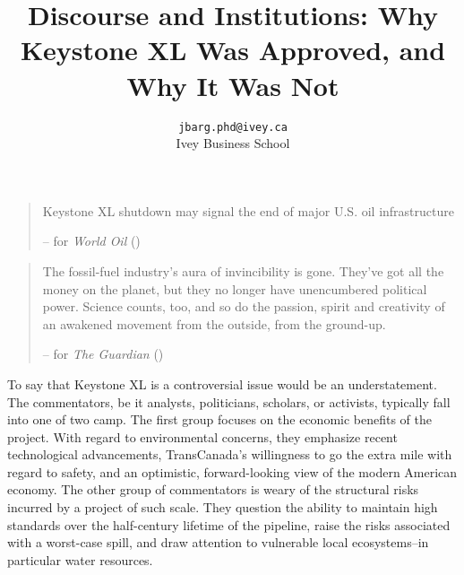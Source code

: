 \documentclass{article}
\title{Discourse and Institutions: Why Keystone XL Was Approved, and Why It Was Not}
\author{
	\texttt{jbarg.phd@ivey.ca}\\
	Ivey Business School
}
\begin{document}
	\maketitle
	\clearpage



	\begin{quote}
		Keystone XL shutdown may signal the end of major U.S. oil infrastructure

		-- \citeauthor{Freitas2021} for \textit{World Oil} (\citeyear{Freitas2021})
	\end{quote}

	\begin{quote}
		The fossil-fuel industry’s aura of invincibility is gone. They’ve got all the money on the planet, but they no longer have unencumbered political power. Science counts, too, and so do the passion, spirit and creativity of an awakened movement from the outside, from the ground-up.

		-- \citeauthor{McKibben2015} for \textit{The Guardian} (\citeyear{McKibben2015})
	\end{quote}

	To say that Keystone XL is a controversial issue would be an understatement. The commentators, be it analysts, politicians, scholars, or activists, typically fall into one of two camp. The first group focuses on the economic benefits of the project. With regard to environmental concerns, they emphasize recent technological advancements, TransCanada's willingness to go the extra mile with regard to safety, and an optimistic, forward-looking view of the modern American economy. The other group of commentators is weary of the structural risks incurred by a project of such scale. They question the ability to maintain high standards over the half-century lifetime of the pipeline, raise the risks associated with a worst-case spill, and draw attention to vulnerable local ecosystems--in particular water resources.
\end{document}
